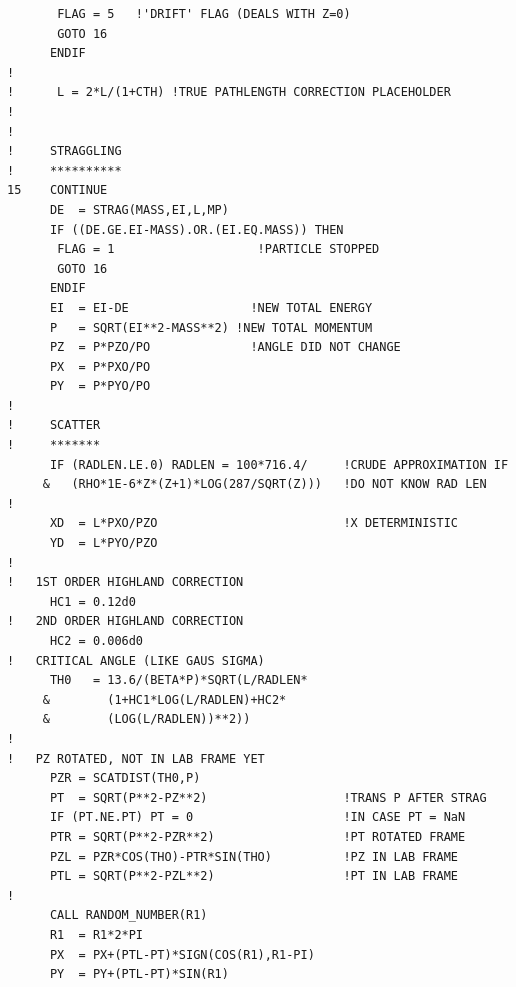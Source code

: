 \begin{lstlisting}
       FLAG = 5   !'DRIFT' FLAG (DEALS WITH Z=0)
       GOTO 16
      ENDIF
!
!      L = 2*L/(1+CTH) !TRUE PATHLENGTH CORRECTION PLACEHOLDER
!
!
!     STRAGGLING
!     **********
15    CONTINUE
      DE  = STRAG(MASS,EI,L,MP)
      IF ((DE.GE.EI-MASS).OR.(EI.EQ.MASS)) THEN
       FLAG = 1                    !PARTICLE STOPPED
       GOTO 16
      ENDIF
      EI  = EI-DE                 !NEW TOTAL ENERGY
      P   = SQRT(EI**2-MASS**2) !NEW TOTAL MOMENTUM
      PZ  = P*PZO/PO              !ANGLE DID NOT CHANGE
      PX  = P*PXO/PO
      PY  = P*PYO/PO
!
!     SCATTER
!     *******
      IF (RADLEN.LE.0) RADLEN = 100*716.4/     !CRUDE APPROXIMATION IF
     &   (RHO*1E-6*Z*(Z+1)*LOG(287/SQRT(Z)))   !DO NOT KNOW RAD LEN
!
      XD  = L*PXO/PZO                          !X DETERMINISTIC
      YD  = L*PYO/PZO
!
!   1ST ORDER HIGHLAND CORRECTION
      HC1 = 0.12d0
!   2ND ORDER HIGHLAND CORRECTION
      HC2 = 0.006d0
!   CRITICAL ANGLE (LIKE GAUS SIGMA)
      TH0   = 13.6/(BETA*P)*SQRT(L/RADLEN*
     &        (1+HC1*LOG(L/RADLEN)+HC2*
     &        (LOG(L/RADLEN))**2))
!
!   PZ ROTATED, NOT IN LAB FRAME YET
      PZR = SCATDIST(TH0,P)
      PT  = SQRT(P**2-PZ**2)                   !TRANS P AFTER STRAG
      IF (PT.NE.PT) PT = 0                     !IN CASE PT = NaN
      PTR = SQRT(P**2-PZR**2)                  !PT ROTATED FRAME
      PZL = PZR*COS(THO)-PTR*SIN(THO)          !PZ IN LAB FRAME
      PTL = SQRT(P**2-PZL**2)                  !PT IN LAB FRAME
!
      CALL RANDOM_NUMBER(R1)
      R1  = R1*2*PI
      PX  = PX+(PTL-PT)*SIGN(COS(R1),R1-PI)
      PY  = PY+(PTL-PT)*SIN(R1)


\end{lstlisting}
